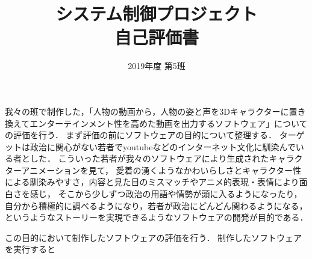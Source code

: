 \documentclass[11pt, a4paper,uplatex]{jsarticle}
\begin{document}
\title{システム制御プロジェクト \\
自己評価書}
\author{2019年度 第5班}
\maketitle

我々の班で制作した，「人物の動画から，人物の姿と声を3Dキャラクターに置き換えてエンターテインメント性を高めた動画を出力するソフトウェア」についての評価を行う．
まず評価の前にソフトウェアの目的について整理する．
ターゲットは政治に関心がない若者でyoutubeなどのインターネット文化に馴染んでいる者とした．
こういった若者が我々のソフトウェアにより生成されたキャラクターアニメーションを見て，
愛着の湧くようなかわいらしさとキャラクター性による馴染みやすさ，内容と見た目のミスマッチやアニメ的表現・表情により面白さを感じ，
そこから少しずつ政治の用語や情勢が頭に入るようになったり，
自分から積極的に調べるようになり，若者が政治にどんどん関わるようになる，
というようなストーリーを実現できるようなソフトウェアの開発が目的である．

この目的において制作したソフトウェアの評価を行う．
制作したソフトウェアを実行すると
\end{document}
